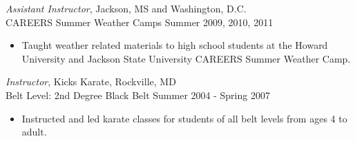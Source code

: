 \documentclass[10pt]{res} %
\begin{document}
\begin{resume}
{\sl Assistant Instructor}, Jackson, MS and Washington, D.C. \\[2pt]
CAREERS Summer Weather Camps \hfill Summer 2009, 2010, 2011 
\begin{itemize} \itemsep 2pt %
\item Taught weather related materials to high school students at the Howard University and Jackson State University CAREERS Summer Weather Camp.
\end{itemize} 

{\sl Instructor}, Kicks Karate, Rockville, MD \\[2pt]
Belt Level: 2nd Degree Black Belt \hfill Summer 2004 - Spring 2007 
\begin{itemize} \itemsep 2pt %
\item Instructed and led karate classes for students of all belt levels from ages 4 to adult.
\end{itemize} 


 



\end{resume}
\end{document}
